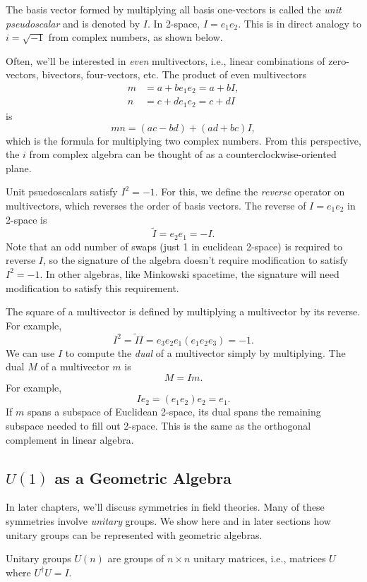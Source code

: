 	The basis vector formed by multiplying all basis one-vectors is called the \emph{unit pseudoscalar} and is denoted by $I$. In 2-space, $I = e_1e_2$. This is in direct analogy to $i = \sqrt{-1}$ from complex numbers, as shown below.
	
	Often, we'll be interested in \emph{even} multivectors, i.e., linear combinations of zero-vectors, bivectors, four-vectors, etc. The product of even multivectors
	\begin{align*}
	m &= a + be_1e_2 = a + bI,\\
	n &= c + de_1e_2 = c + dI
	\end{align*}
	is
	\[
	mn = \left( ac - bd\right)  + \left( ad + bc\right) I,
	\]
	which is the formula for multiplying two complex numbers. From this perspective, the $i$ from complex algebra can be thought of as a counterclockwise-oriented plane.
	
	Unit psuedoscalars satisfy $I^2 = -1$. For this, we define the \emph{reverse} operator on multivectors, which reverses the order of basis vectors. The reverse of $I = e_1e_2$ in 2-space is
	\[
	\tilde{I} = e_2e_1 = -I.
	\]
	Note that an odd number of swaps (just 1 in euclidean 2-space) is required to reverse $I$, so the signature of the algebra doesn't require modification to satisfy $I^2 = -1.$ In other algebras, like Minkowski spacetime, the signature will need modification to satisfy this requirement.
	
	The square of a multivector is defined by multiplying a multivector by its reverse. For example,
	\[
	I^2 = \tilde{I}I = e_3e_2e_1\left( e_1e_2e_3\right)  = -1.
	\]
	We can use $I$ to compute the \emph{dual} of a multivector simply by multiplying. The dual $M$ of a multivector $m$ is
	\[
	M = Im.
	\]
	For example,
	\[
	Ie_2 = \left( e_1e_2\right) e_2 = e_1.
	\]
	If $m$ spans a subspace of Euclidean 2-space, its dual spans the remaining subspace needed to fill out 2-space. This is the same as the orthogonal complement in linear algebra.
	
	\subsection{$U\left( 1\right) $ as a Geometric Algebra}
	In later chapters, we'll discuss symmetries in field theories. Many of these symmetries involve \emph{unitary} groups. We show here and in later sections how unitary groups can be represented with geometric algebras. 
	
	Unitary groups $U\left( n\right) $ are groups of $n \times n$ unitary matrices, i.e., matrices $U$ where $U^\dagger U = I$. 
	
